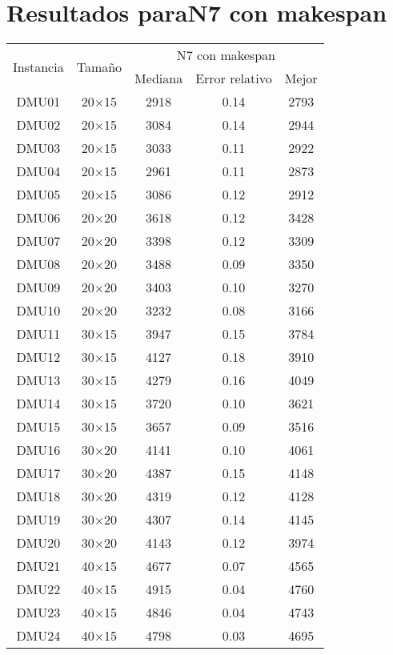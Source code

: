 \section{Resultados paraN7 con makespan}

\begin{table}[H]
\centering
\begin{tabular}{@{}ccccc@{}}
\toprule
\multirow{2}{*}{Instancia} & \multirow{2}{*}{Tamaño} & \multicolumn{3}{c}{N7 con makespan} \\ \cmidrule(lr){3-5}
& & Mediana& Error relativo & Mejor  \\ \midrule
DMU01 & 20$\times$15 & 2918 & 0.14 & 2793\\ 
DMU02 & 20$\times$15 & 3084 & 0.14 & 2944\\ 
DMU03 & 20$\times$15 & 3033 & 0.11 & 2922\\ 
DMU04 & 20$\times$15 & 2961 & 0.11 & 2873\\ 
DMU05 & 20$\times$15 & 3086 & 0.12 & 2912\\ 
DMU06 & 20$\times$20 & 3618 & 0.12 & 3428\\ 
DMU07 & 20$\times$20 & 3398 & 0.12 & 3309\\ 
DMU08 & 20$\times$20 & 3488 & 0.09 & 3350\\ 
DMU09 & 20$\times$20 & 3403 & 0.10 & 3270\\ 
DMU10 & 20$\times$20 & 3232 & 0.08 & 3166\\ 
DMU11 & 30$\times$15 & 3947 & 0.15 & 3784\\ 
DMU12 & 30$\times$15 & 4127 & 0.18 & 3910\\ 
DMU13 & 30$\times$15 & 4279 & 0.16 & 4049\\ 
DMU14 & 30$\times$15 & 3720 & 0.10 & 3621\\ 
DMU15 & 30$\times$15 & 3657 & 0.09 & 3516\\ 
DMU16 & 30$\times$20 & 4141 & 0.10 & 4061\\ 
DMU17 & 30$\times$20 & 4387 & 0.15 & 4148\\ 
DMU18 & 30$\times$20 & 4319 & 0.12 & 4128\\ 
DMU19 & 30$\times$20 & 4307 & 0.14 & 4145\\ 
DMU20 & 30$\times$20 & 4143 & 0.12 & 3974\\ 
DMU21 & 40$\times$15 & 4677 & 0.07 & 4565\\ 
DMU22 & 40$\times$15 & 4915 & 0.04 & 4760\\ 
DMU23 & 40$\times$15 & 4846 & 0.04 & 4743\\ 
DMU24 & 40$\times$15 & 4798 & 0.03 & 4695\\ 

\end{tabular}
\end{table}
